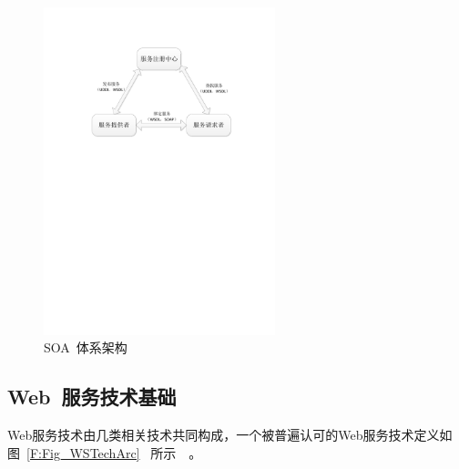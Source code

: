 \begin{figure}[thb]
    \centering
    \includegraphics[width=0.6\textwidth]{./FIGs/Fig_SOA.pdf}
    \caption{SOA~体系架构}
    \label{F:Fig_SOA}
\end{figure}

\subsection{Web~服务技术基础}

Web服务技术由几类相关技术共同构成，一个被普遍认可的Web服务技术定义如图~\ref{F:Fig_WSTechArc}~ 所示~\cite{papazoglou2008web}~。

